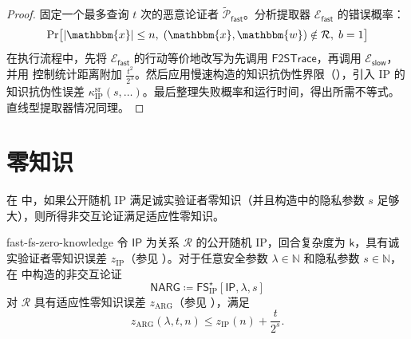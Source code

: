 \documentclass[american,singlepageview]{snargs-book-zh}
\newcommand{\Malicious}[1]{\tilde{#1}}
\newcommand{\DefineEqual}{\coloneqq}
\newcommand{\DecisionBit}{b}
\newcommand{\SomeSize}[1]{|#1|}
\newcommand{\Naturals}{\mathbb{N}}
\newcommand{\Relation}{\mathcal{R}}
\newcommand{\Instance}{\mathbbm{x}}
\newcommand{\Witness}{\mathbbm{w}}
\newcommand{\InstanceSize}{n}
\newcommand{\ProtoProver}{P}
\newcommand{\ProtoExtractor}{E}
\newcommand{\ProtoKnowledgeError}{\kappa}
\newcommand{\ProtoZKError}{z}
\newcommand{\ProtoRoundComplexity}{\mathsf{k}}
\newcommand{\SRSuperscript}{\mathrm{sr}}
\newcommand{\ProtoSRKnowledgeError}{\ProtoKnowledgeError^{\SRSuperscript}}
\newcommand{\IPSymbol}{\mathsf{IP}}
\newcommand{\IPSubscript}{\scriptscriptstyle\mathrm{IP}}
\newcommand{\IPZKError}{\ProtoZKError_{\IPSubscript}}
\newcommand{\IPRoundComplexity}{\ProtoRoundComplexity}
\newcommand{\NARGSymbol}{\mathsf{NARG}}
\newcommand{\ARGSubscript}{\scriptscriptstyle\mathrm{ARG}}
\newcommand{\ARGFormat}[1]{\mathcal{#1}}
\newcommand{\ARGProver}{\ARGFormat{\ProtoProver}}
\newcommand{\ARGExtractor}{\ARGFormat{\ProtoExtractor}}
\newcommand{\ARGZKError}{\ProtoZKError_{\ARGSubscript}}
\newcommand{\ROQueryBound}{t}
\newcommand{\SecurityParameter}{\lambda}
\newcommand{\PrivacyParameter}{s}
\newcommand{\RandSaltSize}{s}
\newcommand{\FormatTransName}[1]{\bm{\mathsf{#1}}}
\newcommand{\FastFSonIPSymbol}{\FormatTransName{FS}_{\IPSubscript}^{\star}}
\newcommand{\FormatTransInputs}[3]{[#1,#2,#3]}
\newcommand{\FastFSonIPTransformation}[3]{\FastFSonIPSymbol\FormatTransInputs{#1}{#2}{#3}}
\newcommand{\SlowFSSymbol}{\mathsf{slow}}
\newcommand{\FastFSSymbol}{\mathsf{fast}}
\newcommand{\FastFSMaliciousProver}{\Malicious{\ARGProver}_{\FastFSSymbol}}
\newcommand{\FastTraceToSlowTrace}{\mathsf{F2STrace}}
\newcommand{\IPSRKnowledgeError}{\ProtoSRKnowledgeError_{\IPSubscript}}
\newcommand{\FSErrorExpression}[1][\ROQueryBound]{\frac{#1^2}{2^{\SecurityParameter}}}
\newcommand{\FSIPZKExpression}{\IPZKError(\InstanceSize)+\frac{\ROQueryBound}{2^{\RandSaltSize}}}
\begin{document}
\begin{proof}
固定一个最多查询 $\ROQueryBound$ 次的恶意论证者 $\FastFSMaliciousProver$。分析提取器 $\ARGExtractor_{\FastFSSymbol}$ 的错误概率：
\[
\Pr\bigl[
\SomeSize{\Instance}\le\InstanceSize,\;
(\Instance,\Witness)\notin\Relation,\;
\DecisionBit=1
\bigr]
\]
在执行流程中，先将 $\ARGExtractor_{\FastFSSymbol}$ 的行动等价地改写为先调用 $\FastTraceToSlowTrace$，再调用 $\ARGExtractor_{\SlowFSSymbol}$，并用  控制统计距离附加 $\FSErrorExpression$。然后应用慢速构造的知识抗伪性界限（），引入 IP 的知识抗伪性误差 $\IPSRKnowledgeError(\PrivacyParameter,\dots)$。最后整理失败概率和运行时间，得出所需不等式。直线型提取器情况同理。
\end{proof}

\section{零知识}
\label{section:fs-zero-knowledge}

在  中，如果公开随机 IP 满足诚实验证者零知识（并且构造中的隐私参数 $\PrivacyParameter$ 足够大），则所得非交互论证满足适应性零知识。

\begin{ImportantTheorem}{}{fast-fs-zero-knowledge}
令 $\IPSymbol$ 为关系 $\Relation$ 的公开随机 IP，回合复杂度为 $\IPRoundComplexity$，具有诚实验证者零知识误差 $\IPZKError$（参见 ）。对于任意安全参数 $\SecurityParameter \in \Naturals$ 和隐私参数 $\PrivacyParameter \in \Naturals$，在  中构造的非交互论证
\[
\NARGSymbol \DefineEqual \FastFSonIPTransformation{\IPSymbol}{\SecurityParameter}{\PrivacyParameter}
\]
对 $\Relation$ 具有适应性零知识误差 $\ARGZKError$（参见 ），满足
\[
\ARGZKError(\SecurityParameter,\ROQueryBound,\InstanceSize)
\le
\FSIPZKExpression.
\]
\end{ImportantTheorem}
\end{document}
